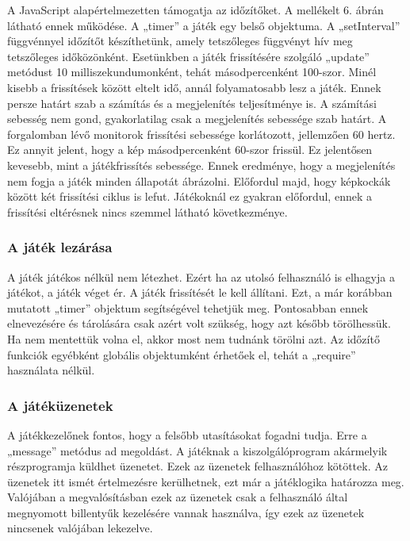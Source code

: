 \documentclass[]{article}
\begin{document}
A JavaScript alapértelmezetten támogatja az időzítőket. A mellékelt 6.
ábrán látható ennek működése. A „timer'' a játék egy belső objektuma. A
„setInterval'' függvénnyel időzítőt készíthetünk, amely tetszőleges
függvényt hív meg tetszőleges időközönként. Esetünkben a játék
frissítésére szolgáló „update'' metódust 10 milliszekundumonként, tehát
másodpercenként 100-szor. Minél kisebb a frissítések között eltelt idő,
annál folyamatosabb lesz a játék. Ennek persze határt szab a számítás és
a megjelenítés teljesítménye is. A számítási sebesség nem gond,
gyakorlatilag csak a megjelenítés sebessége szab határt. A forgalomban
lévő monitorok frissítési sebessége korlátozott, jellemzően 60 hertz. Ez
annyit jelent, hogy a kép másodpercenként 60-szor frissül. Ez jelentősen
kevesebb, mint a játékfrissítés sebessége. Ennek eredménye, hogy a
megjelenítés nem fogja a játék minden állapotát ábrázolni. Előfordul
majd, hogy képkockák között két frissítési ciklus is lefut. Játékoknál
ez gyakran előfordul, ennek a frissítési eltérésnek nincs szemmel
látható következménye.


\subsubsection{A játék lezárása}

A játék játékos nélkül nem létezhet. Ezért ha az utolsó felhasználó is
elhagyja a játékot, a játék véget ér. A játék frissítését le kell
állítani. Ezt, a már korábban mutatott „timer'' objektum segítségével
tehetjük meg. Pontosabban ennek elnevezésére és tárolására csak azért
volt szükség, hogy azt később törölhessük. Ha nem mentettük volna el,
akkor most nem tudnánk törölni azt. Az időzítő funkciók egyébként
globális objektumként érhetőek el, tehát a „require'' használata nélkül.


\subsubsection{A játéküzenetek}

A játékkezelőnek fontos, hogy a felsőbb utasításokat fogadni tudja. Erre
a „message'' metódus ad megoldást. A játéknak a kiszolgálóprogram
akármelyik részprogramja küldhet üzenetet. Ezek az üzenetek
felhasználóhoz kötöttek. Az üzenetek itt ismét értelmezésre kerülhetnek,
ezt már a játéklogika határozza meg. Valójában a megvalósításban ezek az
üzenetek csak a felhasználó által megnyomott billentyűk kezelésére
vannak használva, így ezek az üzenetek nincsenek valójában lekezelve.
\end{document}
